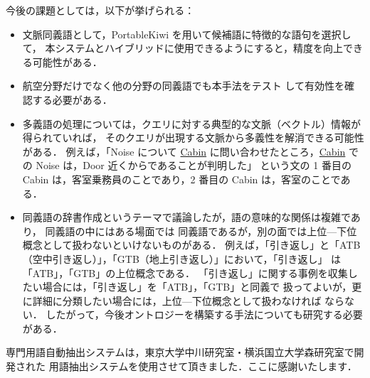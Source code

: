 \documentclass[japanese]{jnlp_1.4}
\begin{document}
今後の課題としては，以下が挙げられる：
\begin{itemize}


\item 文脈同義語として，PortableKiwi を用いて候補語に特徴的な語句を選択して，
本システムとハイブリッドに使用できるようにすると，精度を向上できる可能性がある．

\item 航空分野だけでなく他の分野の同義語でも本手法をテスト
して有効性を確認する必要がある．

\item 多義語の処理については，クエリに対する典型的な文脈（ベクトル）情報が得られていれば，
そのクエリが出現する文脈から多義性を解消できる可能性がある．
例えば，「Noise について \ul{Cabin} に問い合わせたところ，\ul{Cabin} での Noise は，Door 近くからであることが判明した」
という文の 1 番目の Cabin は，客室乗務員のことであり，2 番目の Cabin は，客室のことである．

\item 同義語の辞書作成というテーマで議論したが，語の意味的な関係は複雑であり，
同義語の中にはある場面では
同義語であるが，別の面では上位—下位概念として扱わないといけないものがある．
例えば，「引き返し」と「ATB（空中引き返し）」，「GTB（地上引き返し）」において，「引き返し」
は「ATB」，「GTB」の上位概念である．
「引き返し」に関する事例を収集したい場合には，「引き返し」を「ATB」，「GTB」と同義で
扱ってよいが，更に詳細に分類したい場合には，上位—下位概念として扱わなければ
ならない．
したがって，今後オントロジーを構築する手法についても研究する必要がある．
\end{itemize}


\acknowledgment

専門用語自動抽出システムは，東京大学中川研究室・横浜国立大学森研究室で開発された
用語抽出システムを使用させて頂きました．ここに感謝いたします．
\end{document}
